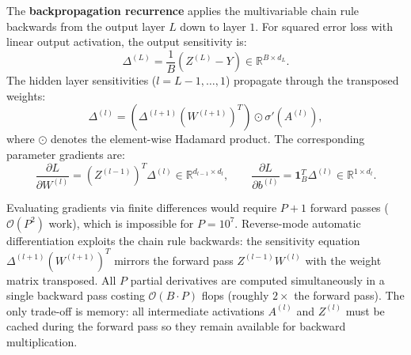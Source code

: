 \begin{theorem}
    The \textbf{backpropagation recurrence} applies the multivariable chain rule backwards from the output layer $L$ down to layer $1$. For squared error loss with linear output activation, the output sensitivity is:
    \begin{equation}
        \Delta^{(L)} = \frac{1}{B} \left( Z^{(L)} - Y \right) \in \mathbb{R}^{B \times d_L}.
    \end{equation}
    The hidden layer sensitivities ($l = L-1, \dots, 1$) propagate through the transposed weights:
    \begin{equation}
        \Delta^{(l)} = \left( \Delta^{(l+1)} (W^{(l+1)})^T \right) \odot \sigma'\left( A^{(l)} \right),
    \end{equation}
    where $\odot$ denotes the element-wise Hadamard product. The corresponding parameter gradients are:
    \begin{equation}
        \frac{\partial L}{\partial W^{(l)}} = \left( Z^{(l-1)} \right)^T \Delta^{(l)} \in \mathbb{R}^{d_{l-1} \times d_l}, \qquad \frac{\partial L}{\partial b^{(l)}} = \mathbf{1}_B^T \Delta^{(l)} \in \mathbb{R}^{1 \times d_l}.
    \end{equation}
\end{theorem}

Evaluating gradients via finite differences would require $P+1$ forward passes ($\mathcal{O}(P^2)$ work), which is impossible for $P = 10^7$. Reverse-mode automatic differentiation exploits the chain rule backwards: the sensitivity equation $\Delta^{(l+1)} (W^{(l+1)})^T$ mirrors the forward pass $Z^{(l-1)} W^{(l)}$ with the weight matrix transposed. All $P$ partial derivatives are computed simultaneously in a single backward pass costing $\mathcal{O}(B \cdot P)$ flops (roughly $2\times$ the forward pass). The only trade-off is memory: all intermediate activations $A^{(l)}$ and $Z^{(l)}$ must be cached during the forward pass so they remain available for backward multiplication.
